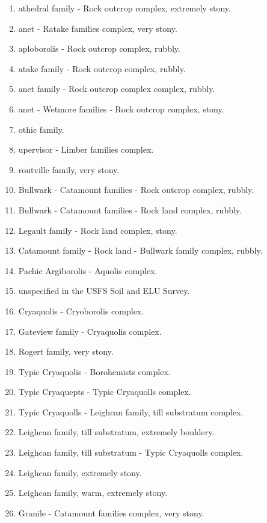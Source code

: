 \documentclass[11pt]{article}
\begin{document}
    \begin{enumerate}

        \item athedral family - Rock outcrop complex, extremely stony.
        \item anet - Ratake families complex, very stony.
        \item aploborolis - Rock outcrop complex, rubbly.
        \item atake family - Rock outcrop complex, rubbly.
        \item anet family - Rock outcrop complex complex, rubbly.
        \item anet - Wetmore families - Rock outcrop complex, stony.
        \item othic family.
        \item upervisor - Limber families complex.
        \item routville family, very stony.
        \item Bullwark - Catamount families - Rock outcrop complex, rubbly.
        \item Bullwark - Catamount families - Rock land complex, rubbly.
        \item Legault family - Rock land complex, stony.
        \item Catamount family - Rock land - Bullwark family complex, rubbly.
        \item Pachic Argiborolis - Aquolis complex.
        \item unspecified in the USFS Soil and ELU Survey.
        \item Cryaquolis - Cryoborolis complex.
        \item Gateview family - Cryaquolis complex.
        \item Rogert family, very stony.
        \item Typic Cryaquolis - Borohemists complex.
        \item Typic Cryaquepts - Typic Cryaquolls complex.
        \item Typic Cryaquolls - Leighcan family, till substratum complex.
        \item Leighcan family, till substratum, extremely bouldery.
        \item Leighcan family, till substratum - Typic Cryaquolls complex.
        \item Leighcan family, extremely stony.
        \item Leighcan family, warm, extremely stony.
        \item Granile - Catamount families complex, very stony.

\end{enumerate}
\end{document}
